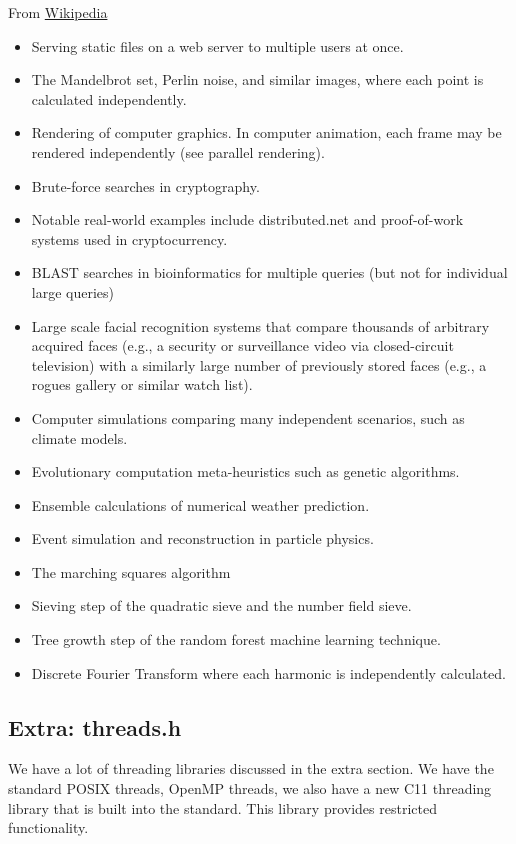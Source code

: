 From \href{https://en.wikipedia.org/wiki/Embarrassingly_parallel}{Wikipedia}
\begin{itemize}
\tightlist
\item Serving static files on a web server to multiple users at once.
\item The Mandelbrot set, Perlin noise, and similar images, where each point is calculated independently.
\item Rendering of computer graphics. In computer animation, each frame may be rendered independently (see parallel rendering).
\item Brute-force searches in cryptography.
\item Notable real-world examples include distributed.net and proof-of-work systems used in cryptocurrency.
\item BLAST searches in bioinformatics for multiple queries (but not for individual large queries)
\item Large scale facial recognition systems that compare thousands of arbitrary acquired faces (e.g., a security or surveillance video via closed-circuit television) with a similarly large number of previously stored faces (e.g., a rogues gallery or similar watch list).
\item Computer simulations comparing many independent scenarios, such as climate models.
\item Evolutionary computation meta-heuristics such as genetic algorithms.
\item Ensemble calculations of numerical weather prediction.
\item Event simulation and reconstruction in particle physics.
\item The marching squares algorithm
\item Sieving step of the quadratic sieve and the number field sieve.
\item Tree growth step of the random forest machine learning technique.
\item Discrete Fourier Transform where each harmonic is independently calculated.
\end{itemize}

\subsection{Extra: threads.h}

We have a lot of threading libraries discussed in the extra section.
We have the standard POSIX threads, OpenMP threads, we also have a new C11 threading library that is built into the standard.
This library provides restricted functionality.


